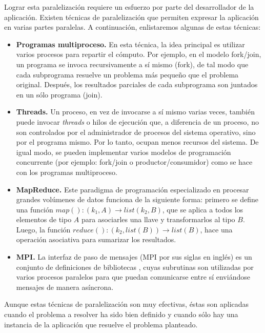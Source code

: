 Lograr esta paralelización requiere un esfuerzo por parte del desarrollador de la aplicación. Existen técnicas de paralelización que permiten expresar la aplicación en varias partes paralelas. A continuación, enlistaremos algunas de estas técnicas:

\begin{itemize}
\item{\textbf{Programas multiproceso.} En esta técnica, la idea principal es utilizar varios procesos para repartir el cómputo. Por ejemplo, en el modelo fork/join, un programa se invoca recursivamente a sí mismo (fork), de tal modo que cada subprograma resuelve un problema más pequeño que el problema original. Después, los resultados parciales de cada subprograma son juntados en un sólo programa (join).}

\item{\textbf{Threads.} Un proceso, en vez de invocarse a sí mismo varias veces, también puede invocar \emph{threads} o hilos de ejecución que, a diferencia de un proceso, no son controlados por el administrador de procesos del sistema operativo, sino por el programa mismo. Por lo tanto, ocupan menos recursos del sistema. De igual modo, se pueden implementar varios modelos de programación concurrente (por ejemplo: fork/join o productor/consumidor) como se hace con los programas multiproceso.}

\item{\textbf{MapReduce.} Este paradigma de programación especializado en procesar grandes volúmenes de datos \cite{dean2008mapreduce} funciona de la siguiente forma: primero se define una función $map(): (k_1,A) \rightarrow list(k_2,B)$, que se aplica a todos los elementos de tipo $A$ para asociarles una llave y transformarlos al tipo $B$. Luego, la función $reduce(): (k_2, list(B)) \rightarrow list(B)$, hace una operación asociativa para sumarizar los resultados.}

\item{\textbf{MPI.} La interfaz de paso de mensajes (MPI por sus siglas en inglés) es un conjunto de definiciones de bibliotecas \cite{lusk2009mpi}, cuyas subrutinas son utilizadas por varios procesos paralelos para que puedan comunicarse entre sí enviándose mensajes de manera asíncrona.}
\end{itemize}

Aunque estas técnicas de paralelización son muy efectivas, éstas son aplicadas cuando el problema a resolver ha sido bien definido y cuando sólo hay una instancia de la aplicación que resuelve el problema planteado. 

